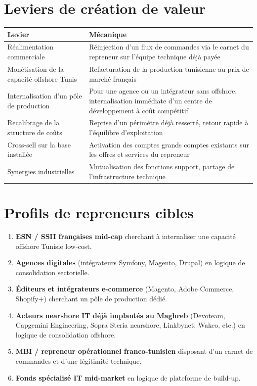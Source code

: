\documentclass[11pt,a4paper]{article}
\begin{document}
\section{Leviers de création de valeur}

\begin{longtable}{L{5.5cm}L{9.5cm}}
\toprule
\textbf{Levier} & \textbf{Mécanique} \\
\midrule
\endhead
Réalimentation commerciale & Réinjection d'un flux de commandes via le carnet du repreneur sur l'équipe technique déjà payée \\
Monétisation de la capacité offshore Tunis & Refacturation de la production tunisienne au prix de marché français \\
Internalisation d'un pôle de production & Pour une agence ou un intégrateur sans offshore, internalisation immédiate d'un centre de développement à coût compétitif \\
Recalibrage de la structure de coûts & Reprise d'un périmètre déjà resserré, retour rapide à l'équilibre d'exploitation \\
Cross-sell sur la base installée & Activation des comptes grands comptes existants sur les offres et services du repreneur \\
Synergies industrielles & Mutualisation des fonctions support, partage de l'infrastructure technique \\
\bottomrule
\end{longtable}

\section{Profils de repreneurs cibles}

\begin{enumerate}[leftmargin=2em]
\item \textbf{ESN / SSII françaises mid-cap} cherchant à internaliser une capacité offshore Tunisie low-cost.
\item \textbf{Agences digitales} (intégrateurs Symfony, Magento, Drupal) en logique de consolidation sectorielle.
\item \textbf{Éditeurs et intégrateurs e-commerce} (Magento, Adobe Commerce, Shopify+) cherchant un pôle de production dédié.
\item \textbf{Acteurs nearshore IT déjà implantés au Maghreb} (Devoteam, Capgemini Engineering, Sopra Steria nearshore, Linkbynet, Wakeo, etc.) en logique de consolidation offshore.
\item \textbf{MBI / repreneur opérationnel franco-tunisien} disposant d'un carnet de commandes et d'une légitimité technique.
\item \textbf{Fonds spécialisé IT mid-market} en logique de plateforme de build-up.
\end{enumerate}
\end{document}
